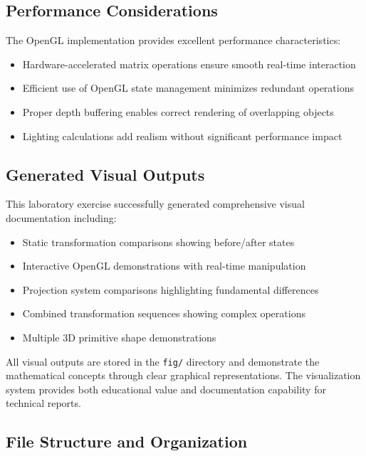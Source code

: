 \documentclass[12pt,a4paper]{article}
\begin{document}
\subsection{Performance Considerations}

The OpenGL implementation provides excellent performance characteristics:

\begin{itemize}
    \item Hardware-accelerated matrix operations ensure smooth real-time interaction
    \item Efficient use of OpenGL state management minimizes redundant operations
    \item Proper depth buffering enables correct rendering of overlapping objects
    \item Lighting calculations add realism without significant performance impact
\end{itemize}

\subsection{Generated Visual Outputs}

This laboratory exercise successfully generated comprehensive visual documentation including:

\begin{itemize}
    \item Static transformation comparisons showing before/after states
    \item Interactive OpenGL demonstrations with real-time manipulation
    \item Projection system comparisons highlighting fundamental differences
    \item Combined transformation sequences showing complex operations
    \item Multiple 3D primitive shape demonstrations
\end{itemize}

All visual outputs are stored in the \texttt{fig/} directory and demonstrate the mathematical concepts through clear graphical representations. The visualization system provides both educational value and documentation capability for technical reports.

\subsection{File Structure and Organization}
\end{document}
